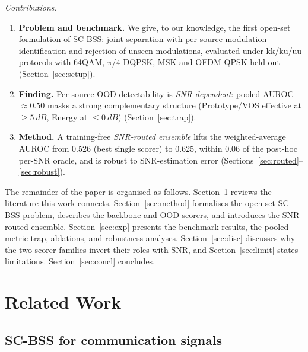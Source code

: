 \documentclass[review,12pt]{elsarticle}
\begin{document}
\emph{Contributions.}
\begin{enumerate}
  \item \textbf{Problem and benchmark.} We give, to our knowledge, the
        first open-set formulation of SC-BSS: joint separation with
        per-source modulation identification and rejection of unseen
        modulations, evaluated under kk/ku/uu protocols with 64QAM,
        $\pi$/4-DQPSK, MSK and OFDM-QPSK held out
        (Section~\ref{sec:setup}).
  \item \textbf{Finding.} Per-source OOD detectability is
        \emph{SNR-dependent}: pooled AUROC $\approx 0.50$ masks a strong
        complementary structure (Prototype/VOS effective at
        $\geq\SI{5}{dB}$, Energy at $\leq\SI{0}{dB}$)
        (Section~\ref{sec:trap}).
  \item \textbf{Method.} A training-free \emph{SNR-routed ensemble}
        lifts the weighted-average AUROC from 0.526 (best single scorer)
        to 0.625, within 0.06 of the post-hoc per-SNR oracle, and is
        robust to SNR-estimation error
        (Sections~\ref{sec:routed}--\ref{sec:robust}).
\end{enumerate}

The remainder of the paper is organised as follows.
Section~\ref{sec:related} reviews the literature this work connects. Section~\ref{sec:method} formalises the open-set SC-BSS
problem, describes the backbone and OOD scorers, and introduces the
SNR-routed ensemble. Section~\ref{sec:exp} presents the benchmark
results, the pooled-metric trap, ablations, and robustness analyses.
Section~\ref{sec:disc} discusses why the two scorer families invert
their roles with SNR, and Section~\ref{sec:limit} states limitations.
Section~\ref{sec:concl} concludes.

\section{Related Work}
\label{sec:related}

\subsection{SC-BSS for communication signals}
\end{document}
